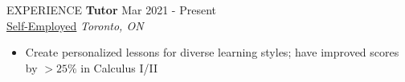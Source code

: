 \documentclass{resume}
\begin{document}
\begin{rSection}{EXPERIENCE}
\textbf{Tutor} \hfill Mar 2021 - Present \\
\href{https://www.overleaf.com/read/qybvrsfbsbwq}{Self-Employed} \hfill \textit{Toronto, ON} 
\vspace{-0.2cm}
\begin{itemize}
   \itemsep -8pt {} 
   \item  Create personalized lessons for diverse learning styles; have improved scores by $ >25\%$ in Calculus I/II
\end{itemize}
\end{rSection} 

\end{document}
